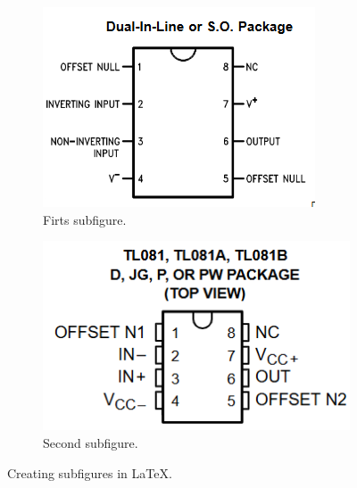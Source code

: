 \documentclass{article}
\begin{document}
	
	\begin{figure}
		
		\centering
		\begin{subfigure}{0.4\textwidth}
			\includegraphics[width=\textwidth]{media/encapsulado-741}
			\caption{Firts subfigure.}
			\label{fig:first}
		\end{subfigure}
		\hfill
		\begin{subfigure}{0.4\textwidth}
			\includegraphics[width=\textwidth]{media/encapsulado-081}
			\caption{Second subfigure.}
			\label{fig:second}
		\end{subfigure}
		\hfill
		
		\caption{Creating subfigures in \LaTeX.}
		\label{fig:figures}
		
	\end{figure}
	
\end{document}
